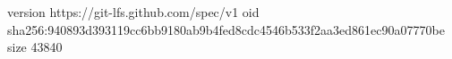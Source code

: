 version https://git-lfs.github.com/spec/v1
oid sha256:940893d393119cc6bb9180ab9b4fed8cdc4546b533f2aa3ed861ec90a07770be
size 43840
